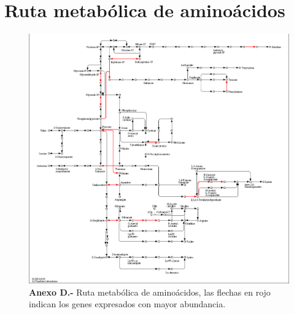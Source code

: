 \documentclass[12pt,letterpaper,oneside]{report}
\begin{document}
\chapter{Ruta metabólica de aminoácidos}
\begin{figure}[!h]
\centering
\includegraphics[scale=0.35]{apendices/D-4}
\caption*{\textbf{Anexo D.-} Ruta metabólica de aminoácidos, las flechas en rojo indican los genes expresados con mayor abundancia.}
\end{figure}
\end{document}

